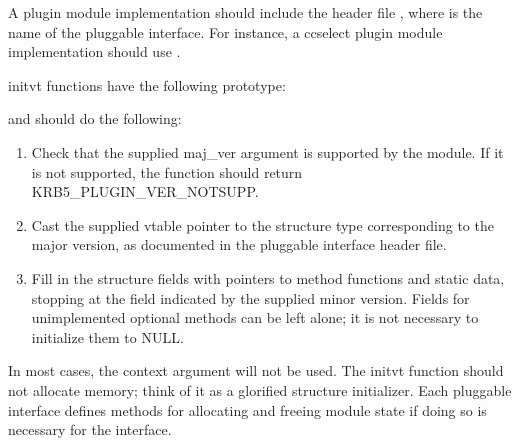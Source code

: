 \documentclass[letterpaper,10pt,english]{sphinxmanual}
\begin{document}
\sphinxAtStartPar
A plugin module implementation should include the header file
, where  is the name of the
pluggable interface.  For instance, a ccselect plugin module
implementation should use .

\sphinxAtStartPar
initvt functions have the following prototype:

\begin{sphinxVerbatim}[commandchars=\\\{\}]
  
                                            
                                          
\end{sphinxVerbatim}

\sphinxAtStartPar
and should do the following:
\begin{enumerate}
%
\item {} 
\sphinxAtStartPar
Check that the supplied maj\_ver argument is supported by the
module.  If it is not supported, the function should return
KRB5\_PLUGIN\_VER\_NOTSUPP.

\item {} 
\sphinxAtStartPar
Cast the supplied vtable pointer to the structure type
corresponding to the major version, as documented in the pluggable
interface header file.

\item {} 
\sphinxAtStartPar
Fill in the structure fields with pointers to method functions and
static data, stopping at the field indicated by the supplied minor
version.  Fields for unimplemented optional methods can be left
alone; it is not necessary to initialize them to NULL.

\end{enumerate}

\sphinxAtStartPar
In most cases, the context argument will not be used.  The initvt
function should not allocate memory; think of it as a glorified
structure initializer.  Each pluggable interface defines methods for
allocating and freeing module state if doing so is necessary for the
interface.
\end{document}
